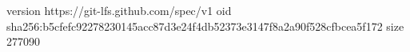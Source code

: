version https://git-lfs.github.com/spec/v1
oid sha256:b5cfefc92278230145acc87d3e24f4db52373e3147f8a2a90f528cfbcea5f172
size 277090
